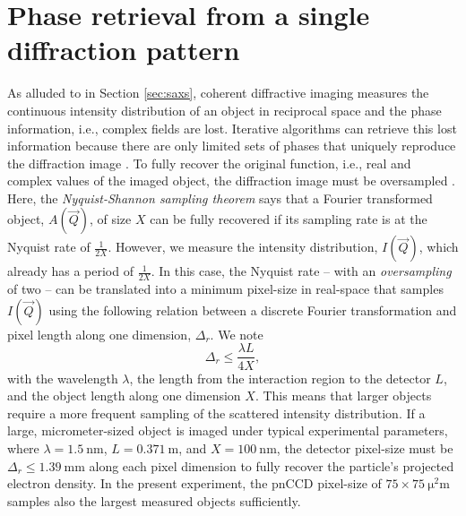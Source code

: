 \section{Phase retrieval from a single diffraction pattern}\label{sec:phase-retrieval}
As alluded to in Section \ref{sec:saxs}, coherent diffractive imaging measures the continuous intensity distribution of an object in reciprocal space and the phase information, i.e., complex fields are lost. Iterative algorithms can retrieve this lost information because there are only limited sets of phases that uniquely reproduce the diffraction image \citep{Bruck-1979-OpticsCom,Bates-1981-Optik}. To fully recover the original function, i.e., real and complex values of the imaged object, the diffraction image must be oversampled \citep{Sayre-1952-ActCryst}. Here, the \textit{Nyquist-Shannon sampling theorem} says that a Fourier transformed object, $A(\vec{Q})$, of size $X$ can be fully recovered if its sampling rate is at the Nyquist rate of $\tfrac{1}{2X}$. However, we measure the intensity distribution, $I(\vec{Q})$, which already has a period of $\tfrac{1}{2X}$. In this case, the Nyquist rate -- with an \textit{oversampling} of two -- can be translated into a minimum pixel-size in real-space that samples $I(\vec{Q})$ using the following relation between a discrete Fourier transformation and pixel length along one dimension, $\Delta_{r}$. We note \citep{Williams-2010-NJP}
\begin{equation}
\Delta_{r} \leq \frac{\lambda L}{4 X},
\label{eq:disc-fourier-relation-pixelsize}
\end{equation}
with the wavelength $\lambda$, the length from the interaction region to the detector $L$, and the object length along one dimension $X$. This means that larger objects require a more frequent sampling of the scattered intensity distribution. If a large, micrometer-sized object is imaged under typical experimental parameters, where $\lambda = \SI{1.5}{\nano\meter}$, $L = \SI{0.371}{\meter}$, and $X=\SI{100}{\nano\meter}$, the detector pixel-size must be $\Delta_{r} \leq \SI{1.39}{\milli\meter}$ along each pixel dimension to fully recover the particle's projected electron density. In the present experiment, the pnCCD pixel-size of $75 \times \SI{75}{\square\micro\meter}$ samples also the largest measured objects sufficiently.
%
%
%
